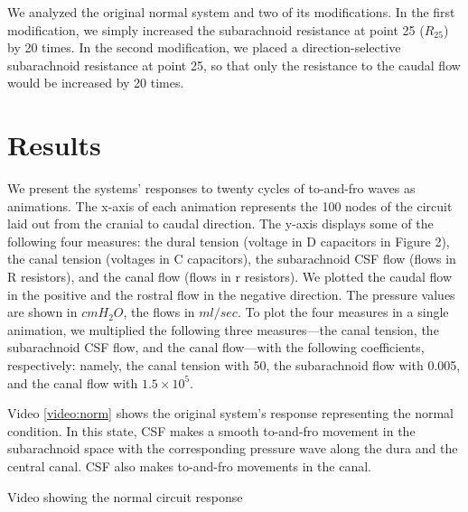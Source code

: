 \documentclass[fleqn,10pt]{wlscirep}
\begin{document}
We analyzed the original normal system and two of its modifications. In the
first modification, we simply increased the subarachnoid resistance at
point 25 ($R_{25}$) by 20 times. In the second modification, we placed a
direction-selective subarachnoid resistance at point 25, so that only the
resistance to the caudal flow would be increased by 20 times.

\section*{Results}

We present the systems' responses to twenty cycles of to-and-fro waves as
animations. The x-axis of each animation represents the 100 nodes of the
circuit laid out from the cranial to caudal direction. The y-axis displays
some of the following four measures: the dural tension (voltage in D
capacitors in Figure 2), the canal tension (voltages in C capacitors), the
subarachnoid CSF flow (flows in R resistors), and the canal flow (flows in
r resistors). We plotted the caudal flow in the positive and the rostral
flow in the negative direction. The pressure values are shown in $cmH_2O$,
the flows in $ml/sec$. To plot the four measures in a single animation, we
multiplied the following three measures---the canal tension, the
subarachnoid CSF flow, and the canal flow---with the following
coefficients, respectively: namely, the canal tension with 50, the
subarachnoid flow with 0.005, and the canal flow with $1.5\times10^{5}$. 

Video \ref{video:norm} shows the original system's response representing
the normal condition. In this state, CSF makes a smooth to-and-fro movement
in the subarachnoid space with the corresponding pressure wave along the
dura and the central canal. CSF also makes to-and-fro movements in the
canal.

\begin{video}[hbt]
    \caption{Video showing the normal circuit response}
    \label{video:norm}
\end{video}
\end{document}
